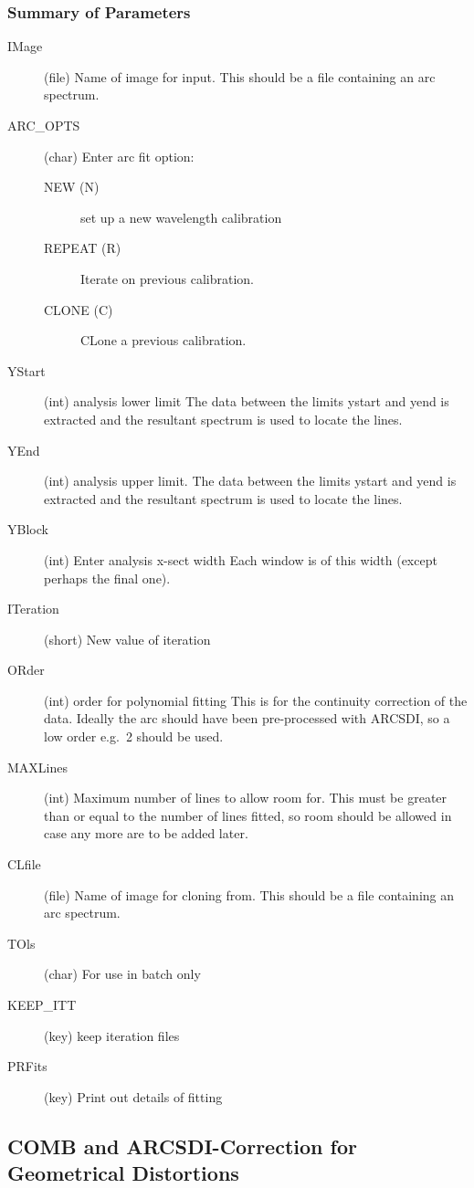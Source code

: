 \subsubsection{Summary of Parameters}

\begin{description}
\item[IMage] (file) Name of image for input. This should be a file
containing an arc spectrum.
\item[ARC\_OPTS] (char) Enter arc fit option:
\begin{description}
\item[NEW (N)] set up a new wavelength calibration
\item[REPEAT (R)] Iterate on previous calibration.
\item[CLONE (C)] CLone a previous calibration.
\end{description}
\item[YStart] (int) analysis lower limit The data between the
limits ystart and yend is extracted and the resultant spectrum is used
to locate the lines.
\item[YEnd] (int) analysis upper limit. The data between the
limits ystart and yend is extracted and the resultant spectrum is used
to locate the lines.
\item[YBlock] (int) Enter analysis x-sect width Each window is
of this width (except perhaps the final one).
\item[ITeration] (short) New value of iteration
\item[ORder] (int) order for polynomial fitting This is for the
continuity correction of the data. Ideally the arc should have been
pre-processed with ARCSDI, so a low order e.g.\ 2 should be used.
\item[MAXLines] (int) Maximum number of lines to allow room for.
This must be greater than or equal to the number of lines fitted, so
room should be allowed in case any more are to be added later.
\item[CLfile] (file) Name of image for cloning from. This should
be a file containing an arc spectrum.
\item[TOls] (char) For use in batch only
\item[KEEP\_ITT] (key) keep iteration files
\item[PRFits] (key) Print out details of fitting
\end{description}

\subsection{%
COMB and ARCSDI-Correction for Geometrical Distortions}

